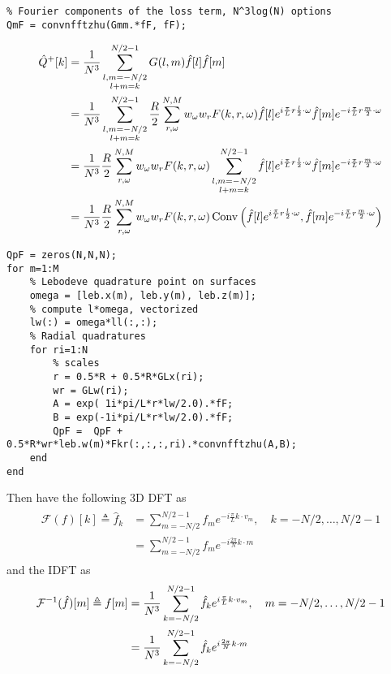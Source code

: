 \documentclass[11pt]{amsart}
\begin{document}
\begin{lstlisting}
% Fourier components of the loss term, N^3log(N) options
QmF = convnfftzhu(Gmm.*fF, fF);
\end{lstlisting}

\begin{align*}\begin{split}
\hat Q^{+}[k] &=  \frac{1}{N^3}\sum_{\substack{l,m= -N/2 \\ l+m = k}}^{N/2-1} G(l,m)\hat f[l] \hat f[m]\\
&= \frac{1}{N^3}\sum_{\substack{l,m= -N/2 \\ l+m = k}}^{N/2-1} \frac{R}{2}\sum_{r, \omega}^{N,M}w_\omega w_r F(k,r,\omega)\hat f[l] e^{i {\pi \over L} r \frac{l}{2}\cdot \omega} \hat f[m]e^{-i {\pi \over L} r \frac{m}{2}\cdot \omega}\\
&=\frac{1}{N^3} \frac{R}{2}\sum_{r, \omega}^{N,M}w_\omega w_r F(k,r,\omega)\sum_{\substack{l,m= -N/2 \\ l+m = k}}^{N/2-1} \hat f[l] e^{i {\pi \over L} r \frac{l}{2}\cdot \omega} \hat f[m]e^{-i {\pi \over L} r \frac{m}{2}\cdot \omega}\\
&= \frac{1}{N^3}\frac{R}{2}\sum_{r, \omega}^{N,M}w_\omega w_r F(k,r,\omega) \operatorname{Conv}\left(\hat f[l] e^{i {\pi \over L} r \frac{l}{2}\cdot \omega} ,\hat f[m]e^{-i {\pi \over L} r \frac{m}{2}\cdot \omega} \right)\\
\end{split}\end{align*}

\begin{lstlisting}
QpF = zeros(N,N,N);
for m=1:M
    % Lebodeve quadrature point on surfaces
    omega = [leb.x(m), leb.y(m), leb.z(m)];
    % compute l*omega, vectorized
    lw(:) = omega*ll(:,:);
    % Radial quadratures
    for ri=1:N
        % scales
        r = 0.5*R + 0.5*R*GLx(ri);
        wr = GLw(ri);
        A = exp( 1i*pi/L*r*lw/2.0).*fF;
        B = exp(-1i*pi/L*r*lw/2.0).*fF;
        QpF =  QpF + 0.5*R*wr*leb.w(m)*Fkr(:,:,:,ri).*convnfftzhu(A,B);
    end
end
\end{lstlisting}

\color{black}



Then have the following 3D DFT as
\begin{align}
\begin{split}
\mathcal{F}(f)[k] \triangleq \hat f_k  &= \sum_{m=-N/2}^{N/2-1}f_me^{-i \frac{\pi}{L}k\cdot v_m},\quad k = -N/2, \ldots, N/2-1 \\
&= \sum_{m=-N/2}^{N/2-1}f_me^{-i \frac{2\pi}{N}k\cdot m}
\end{split}
\end{align}
and the IDFT as
\begin{align}
\begin{split}
\mathcal{F}^{-1}(\hat f)[m] \triangleq f[m] &= \frac{1}{N^3} \sum_{k=-N/2}^{N/2-1} \hat f_k e^{i {\pi \over L} k \cdot v_m}, \quad m = -N/2, \ldots, N/2-1 \\
&= \frac{1}{N^3} \sum_{k=-N/2}^{N/2-1}\hat f_ke^{i \frac{2\pi}{N}k\cdot m}
\end{split}
\end{align}
\end{document}
